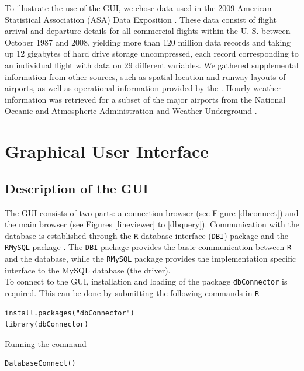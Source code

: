 \documentclass[11pt]{tise_style}
\begin{document}
To illustrate the use of the GUI, we chose data used in the 2009 American Statistical
Association (ASA) Data Exposition \citep{dataexpo, dataexpourl}. These data consist of flight arrival and departure details for all commercial flights within the U.\! S.\! between October 1987 and 2008, yielding more than 120 million data records and taking up 12 gigabytes of hard drive storage uncompressed, each record corresponding to an individual flight with data on 29 different variables. 
We gathered supplemental information from other sources, such as spatial location and runway layouts of airports, as well as operational information provided by the \citet{faa}. Hourly weather information was retrieved for a subset of the major airports from the National Oceanic and Atmospheric Administration \citep{noaa} and Weather Underground \citep{wunderground}. 


\section{{Graphical User Interface}}

\subsection{Description of the GUI}

The GUI consists of two parts: a connection browser (see Figure \ref{dbconnect}) and the main
browser (see Figures \ref{lineviewer}  to \ref{dbquery}). Communication with the database is established through the {\tt R} database interface ({\tt DBI}) package \citep{dbi} and the {\tt RMySQL} package \citep{rmysql}. The  {\tt DBI}  package provides the basic  communication between {\tt R} and the database, while the {\tt RMySQL} package provides the implementation specific interface to the MySQL database (the driver).\\
To connect to the GUI, installation and loading of the package {\tt dbConnector} is required. This can be done by submitting the following commands in {\tt R}
\vspace{-0.5cm}
\begin{verbatim}
install.packages("dbConnector")
library(dbConnector)
\end{verbatim} \vspace{-0.5cm}

Running the command \vspace{-0.5cm}
\begin{verbatim}
DatabaseConnect()
\end{verbatim} \vspace{-0.5cm}
\end{document}
